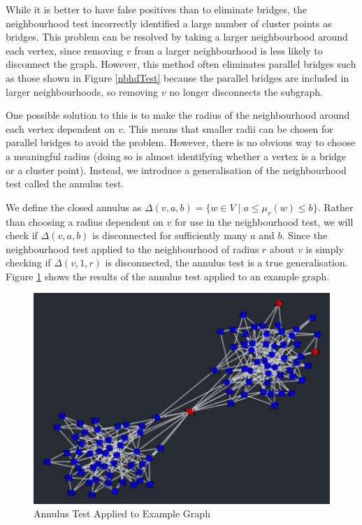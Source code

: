 \documentclass[12pt,a4paper]{amsart}
\numberwithin{equation}{section}
\def\D{\Delta}
\theoremstyle{plain}
\theoremstyle{definition}
\begin{document}
While it is better to have false positives than to eliminate bridges, the neighbourhood test incorrectly identified a large number of cluster points as bridges. This problem can be resolved by taking a larger neighbourhood around each vertex, since removing $v$ from a larger neighbourhood is less likely to disconnect the graph. However, this method often eliminates parallel bridges such as those shown in Figure \ref{nbhdTest} because the parallel bridges are included in larger neighbourhoods, so removing $v$ no longer disconnects the subgraph.

One possible solution to this is to make the radius of the neighbourhood around each vertex dependent on $v$. This means that smaller radii can be chosen for parallel bridges to avoid the problem. However, there is no obvious way to choose a meaningful radius (doing so is almost identifying whether a vertex is a bridge or a cluster point). Instead, we introduce a generalisation of the neighbourhood test called the annulus test. 

We define the closed annulus as $\D(v,a,b) = \{w \in V \mid a \leq \mu_v(w) \leq b\}$. Rather than choosing a radius dependent on $v$ for use in the neighbourhood test, we will check if $\D(v,a,b)$ is disconnected for sufficiently many $a$ and $b$. Since the neighbourhood test applied to the neighbourhood of radius $r$ about $v$ is simply checking if $\D(v,1,r)$ is disconnected, the annulus test is a true generalisation. Figure \ref{annulTest} shows the results of the annulus test applied to an example graph.

\begin{figure}[h]
	\centering
	\includegraphics[scale=1]{AnnulusTest.jpg}
	\caption{Annulus Test Applied to Example Graph}
	\label{annulTest}
\end{figure}
\end{document}
